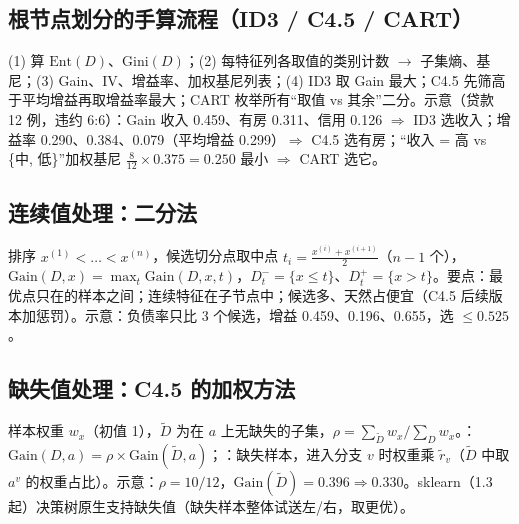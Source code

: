 \subsection{根节点划分的手算流程（ID3 / C4.5 / CART）}
(1) 算 $\mathrm{Ent}(D)$、$\mathrm{Gini}(D)$；(2) 每特征列各取值的类别计数 $\to$ 子集熵、基尼；(3) Gain、IV、增益率、加权基尼列表；(4) ID3 取 Gain 最大；C4.5 先筛高于平均增益再取增益率最大；CART 枚举所有“取值 vs 其余”二分。示意（贷款 12 例，违约 6:6）：Gain 收入 0.459、有房 0.311、信用 0.126 $\Rightarrow$ ID3 选收入；增益率 0.290、0.384、0.079（平均增益 0.299）$\Rightarrow$ C4.5 选有房；“收入 = 高 vs \{中, 低\}”加权基尼 $\frac8{12}\times0.375=0.250$ 最小 $\Rightarrow$ CART 选它。

\subsection{连续值处理：二分法}
排序 $x^{(1)}<\dots<x^{(n)}$，候选切分点取中点 $t_i=\frac{x^{(i)}+x^{(i+1)}}2$（$n-1$ 个），$\mathrm{Gain}(D,x)=\max_t\mathrm{Gain}(D,x,t)$，$D_t^-=\{x\le t\}$、$D_t^+=\{x>t\}$。要点：最优点只在的样本之间；连续特征在子节点中；候选多、天然占便宜（C4.5 后续版本加惩罚）。示意：负债率只比 3 个候选，增益 0.459、0.196、0.655，选 $\le0.525$。

\subsection{缺失值处理：C4.5 的加权方法}
样本权重 $w_x$（初值 1），$\tilde D$ 为在 $a$ 上无缺失的子集，$\rho=\sum_{\tilde D}w_x/\sum_Dw_x$。：$\mathrm{Gain}(D,a)=\rho\times\mathrm{Gain}(\tilde D,a)$；：缺失样本，进入分支 $v$ 时权重乘 $\tilde r_v$（$\tilde D$ 中取 $a^v$ 的权重占比）。示意：$\rho=10/12$，$\mathrm{Gain}(\tilde D)=0.396\Rightarrow0.330$。sklearn（1.3 起）决策树原生支持缺失值（缺失样本整体试送左/右，取更优）。

